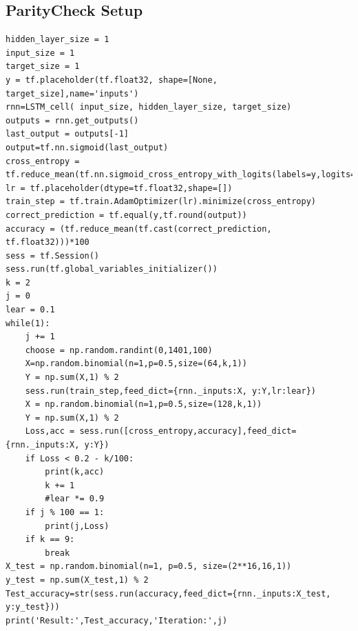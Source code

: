 \documentclass[12pt, letterpaper]{article}
\begin{document}
\subsection{ParityCheck Setup}
\begin{verbatim}
hidden_layer_size = 1
input_size = 1
target_size = 1
y = tf.placeholder(tf.float32, shape=[None, target_size],name='inputs')
rnn=LSTM_cell( input_size, hidden_layer_size, target_size)
outputs = rnn.get_outputs()
last_output = outputs[-1]
output=tf.nn.sigmoid(last_output)
cross_entropy = tf.reduce_mean(tf.nn.sigmoid_cross_entropy_with_logits(labels=y,logits=last_output))
lr = tf.placeholder(dtype=tf.float32,shape=[])
train_step = tf.train.AdamOptimizer(lr).minimize(cross_entropy)
correct_prediction = tf.equal(y,tf.round(output))
accuracy = (tf.reduce_mean(tf.cast(correct_prediction, tf.float32)))*100
sess = tf.Session()
sess.run(tf.global_variables_initializer())
k = 2
j = 0
lear = 0.1
while(1):
    j += 1
    choose = np.random.randint(0,1401,100)
    X=np.random.binomial(n=1,p=0.5,size=(64,k,1))
    Y = np.sum(X,1) % 2
    sess.run(train_step,feed_dict={rnn._inputs:X, y:Y,lr:lear})
    X = np.random.binomial(n=1,p=0.5,size=(128,k,1))
    Y = np.sum(X,1) % 2
    Loss,acc = sess.run([cross_entropy,accuracy],feed_dict={rnn._inputs:X, y:Y})
    if Loss < 0.2 - k/100:
        print(k,acc)
        k += 1
        #lear *= 0.9
    if j % 100 == 1:
        print(j,Loss)
    if k == 9:
        break
X_test = np.random.binomial(n=1, p=0.5, size=(2**16,16,1))
y_test = np.sum(X_test,1) % 2
Test_accuracy=str(sess.run(accuracy,feed_dict={rnn._inputs:X_test, y:y_test}))
print('Result:',Test_accuracy,'Iteration:',j)
\end{verbatim}
\end{document}
